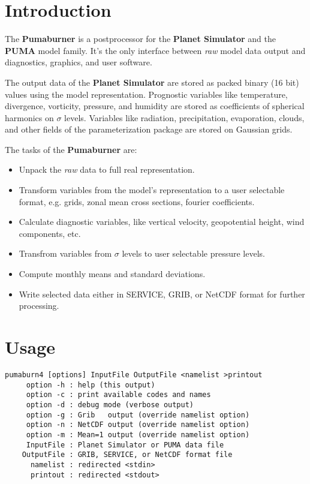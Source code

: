 \section{Introduction}

The {\bf Pumaburner} is a postprocessor for the {\bf Planet Simulator}
and the {\bf PUMA} model family.
It's the only interface between {\it raw} model data output
and diagnostics, graphics, and user software.

The output data of the {\bf Planet Simulator} are stored as
packed binary (16 bit) values using the model representation.
Prognostic variables like temperature, divergence, vorticity,
pressure, and humidity are stored as coefficients of spherical harmonics
on $\sigma$ levels. Variables like radiation,
precipitation, evaporation, clouds, and other fields of the
parameterization package are stored on Gaussian grids.

The tasks of the {\bf Pumaburner} are:
\begin{itemize}
\item Unpack the {\it raw} data to full real representation.
\item Transform variables from the model's representation
      to a user selectable format, e.g. grids,
      zonal mean cross sections, fourier coefficients.
\item Calculate diagnostic variables, like vertical velocity,
      geopotential height, wind components, etc.
\item Transfrom variables from $\sigma$ levels to user
      selectable pressure levels.
\item Compute monthly means and standard deviations.
\item Write selected data either in SERVICE, GRIB, or NetCDF format
      for further processing.
\end{itemize}

\section{Usage}

\begin{verbatim}
pumaburn4 [options] InputFile OutputFile <namelist >printout
     option -h : help (this output)
     option -c : print available codes and names
     option -d : debug mode (verbose output)
     option -g : Grib   output (override namelist option)
     option -n : NetCDF output (override namelist option)
     option -m : Mean=1 output (override namelist option)
     InputFile : Planet Simulator or PUMA data file
    OutputFile : GRIB, SERVICE, or NetCDF format file
      namelist : redirected <stdin>
      printout : redirected <stdout>
\end{verbatim}

